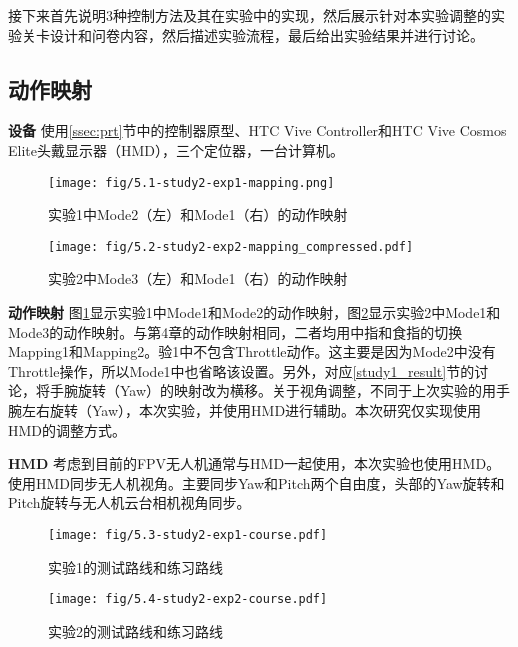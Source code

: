 接下来首先说明3种控制方法及其在实验中的实现，然后展示针对本实验调整的实验关卡设计和问卷内容，然后描述实验流程，最后给出实验结果并进行讨论。

\subsection{动作映射}

\textbf{设备}\hspace{1pt}
使用\ref{ssec:prt}节中的控制器原型、HTC Vive Controller和HTC Vive Cosmos Elite头戴显示器（HMD），三个定位器，一台计算机。

\begin{figure}[t]
    \centering
    \texttt{[image: fig/5.1-study2-exp1-mapping.png]}
    \caption{实验1中Mode2（左）和Mode1（右）的动作映射}
    \label{fig:exp1_mode1_and_mode2}
\end{figure}

\begin{figure}[t]
    \centering
    \texttt{[image: fig/5.2-study2-exp2-mapping\_compressed.pdf]}
    \caption{实验2中Mode3（左）和Mode1（右）的动作映射}
    \label{fig:exp2_mode1_and_mode3}
\end{figure}

\textbf{动作映射}\hspace{1pt}
图\ref{fig:exp1_mode1_and_mode2}显示实验1中Mode1和Mode2的动作映射，图\ref{fig:exp2_mode1_and_mode3}显示实验2中Mode1和Mode3的动作映射。与第4章的动作映射相同，二者均用中指和食指的切换Mapping1和Mapping2。验1中不包含Throttle动作。这主要是因为Mode2中没有Throttle操作，所以Mode1中也省略该设置。另外，对应\ref{study1_result}节的讨论，将手腕旋转（Yaw）的映射改为横移。关于视角调整，不同于上次实验的用手腕左右旋转（Yaw），本次实验，并使用HMD进行辅助。本次研究仅实现使用HMD的调整方式。

\textbf{HMD}\hspace{1pt}
考虑到目前的FPV无人机通常与HMD一起使用，本次实验也使用HMD。使用HMD同步无人机视角。主要同步Yaw和Pitch两个自由度，头部的Yaw旋转和Pitch旋转与无人机云台相机视角同步。


\begin{figure}[t]
    \vspace{-2em}
    \centering
    \texttt{[image: fig/5.3-study2-exp1-course.pdf]}
    \caption{实验1的测试路线和练习路线}
    \label{fig:study2-exp1-course}
\end{figure}

\begin{figure}[t]
    \centering
    \texttt{[image: fig/5.4-study2-exp2-course.pdf]}
    \caption{实验2的测试路线和练习路线}
    \label{fig:study2-exp2-course}
\end{figure}

